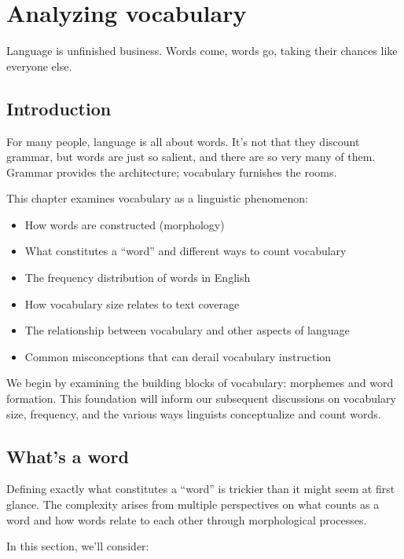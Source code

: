 \chapter{Analyzing vocabulary} \label{ch:vocabulary}

\epigraph{Language is unfinished business. Words come, words go, taking their chances like everyone else.}{}

\section{Introduction} \label{sec:intro}

For many people, language is all about words. It's not that they discount grammar, but words are just so salient, and there are so very many of them. Grammar provides the architecture; vocabulary furnishes the rooms.

This chapter examines vocabulary as a linguistic phenomenon:

\begin{itemize}[noitemsep]
\item How words are constructed (morphology)
\item What constitutes a ``word'' and different ways to count vocabulary
\item The frequency distribution of words in English
\item How vocabulary size relates to text coverage
\item The relationship between vocabulary and other aspects of language
\item Common misconceptions that can derail vocabulary instruction
\end{itemize}

We begin by examining the building blocks of vocabulary: morphemes and word formation. This foundation will inform our subsequent discussions on vocabulary size, frequency, and the various ways linguists conceptualize and count words.

\section{What's a word}\label{sec:what-is-a-word}

Defining exactly what constitutes a ``word'' is trickier than it might seem at first glance. The complexity arises from multiple perspectives on what counts as a word and how words relate to each other through morphological processes.

In this section, we'll consider:

